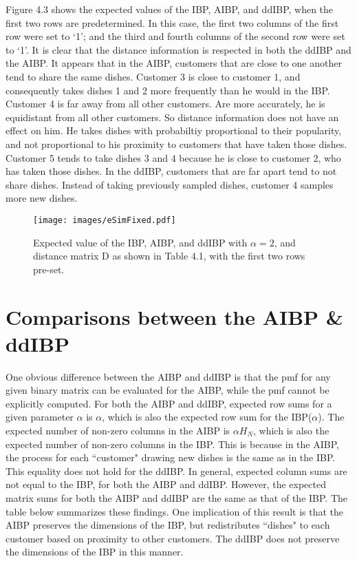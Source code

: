 \noindent
Figure 4.3 shows the expected values of the IBP, AIBP, and ddIBP, when the
first two rows are predetermined. In this case, the first two columns of the
first row were set to `1'; and the third and fourth columns of the second row
were set to `1'. It is clear that the distance information is respected in both
the ddIBP and the AIBP. It appears that in the AIBP, customers that are close
to one another tend to share the same dishes. Customer 3 is close to customer
1, and consequently takes dishes 1 and 2 more frequently than he would in the
IBP.  Customer 4 is far away from all other customers. Are more accurately, he
is equidistant from all other customers. So distance information does not have
an effect on him. He takes dishes with probabiltiy proportional to their
popularity, and not proportional to his proximity to customers that have taken
those dishes. Customer 5 tends to take dishes 3 and 4 because he is close to
customer 2, who has taken those dishes. In the ddIBP, customers that are far
apart tend to not share dishes. Instead of taking previously sampled dishes,
customer 4 samples more new dishes. 

\begin{figure}\begin{center}
  \texttt{[image: images/eSimFixed.pdf]}
  \caption{Expected value of the IBP, AIBP, and ddIBP with $\alpha=2$, and
           distance matrix D as shown in Table 4.1, with the first two rows
           pre-set.}
\end{center}\end{figure}


\section{Comparisons between the AIBP \& ddIBP}
One obvious difference between the AIBP and ddIBP is that the pmf for any given
binary matrix can be evaluated for the AIBP, while the pmf cannot be explicitly
computed. For both the AIBP and ddIBP, expected row sums for a given parameter
$\alpha$ is $\alpha$, which is also the expected row sum for the IBP($\alpha$).
The expected number of non-zero columns in the AIBP is $\alpha H_N$, which is
also the expected number of non-zero columns in the IBP. This is because in the
AIBP, the process for each ``customer" drawing new dishes is the same as in the
IBP. This equality does not hold for the ddIBP. In general, expected column
sums are not equal to the IBP, for both the AIBP and ddIBP. However, the
expected matrix sums for both the AIBP and ddIBP are the same as that of the
IBP. The table below summarizes these findings. One implication of this result
is that the AIBP preserves the dimensions of the IBP, but redistributes
``dishes" to each customer based on proximity to other customers. The ddIBP
does not preserve the dimensions of the IBP in this manner. \\

